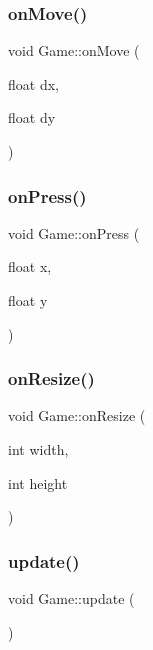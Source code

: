 \mbox{\label{class_game_a917775d182dc99ce4594caa198f9b07b}} 
\subsubsection{\texorpdfstring{on\+Move()}{onMove()}}
{\footnotesize\ttfamily void Game\+::on\+Move (\begin{DoxyParamCaption}\item[{float}]{dx,  }\item[{float}]{dy }\end{DoxyParamCaption})}

\mbox{\label{class_game_a298fe3c6527c1d0009be16692d28fc8b}} 
\subsubsection{\texorpdfstring{on\+Press()}{onPress()}}
{\footnotesize\ttfamily void Game\+::on\+Press (\begin{DoxyParamCaption}\item[{float}]{x,  }\item[{float}]{y }\end{DoxyParamCaption})}

\mbox{\label{class_game_a9555483a80e47a4d41b6eeafebeb0882}} 
\subsubsection{\texorpdfstring{on\+Resize()}{onResize()}}
{\footnotesize\ttfamily void Game\+::on\+Resize (\begin{DoxyParamCaption}\item[{int}]{width,  }\item[{int}]{height }\end{DoxyParamCaption})}

\mbox{\label{class_game_a79df6376b332d63c9eca0dcee30305c3}} 
\subsubsection{\texorpdfstring{update()}{update()}}
{\footnotesize\ttfamily void Game\+::update (\begin{DoxyParamCaption}{ }\end{DoxyParamCaption})}



